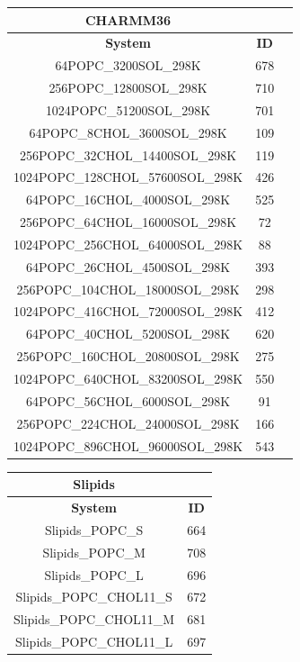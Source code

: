 \documentclass[journal=jpcbfk,manuscript=suppinfo]{achemso}
\begin{document}
\clearpage

\begin{table}[]
\begin{small}
\begin{tabular}{ccc}
\textbf{CHARMM36} \\
\toprule
\textbf{System} & \textbf{ID} \\
\midrule
64POPC\_3200SOL\_298K  &  678 \\ 
256POPC\_12800SOL\_298K  &  710 \\ 
1024POPC\_51200SOL\_298K  &  701 \\ 
\midrule
64POPC\_8CHOL\_3600SOL\_298K  &  109 \\ 
256POPC\_32CHOL\_14400SOL\_298K  &  119 \\ 
1024POPC\_128CHOL\_57600SOL\_298K  &  426 \\ 
\midrule
64POPC\_16CHOL\_4000SOL\_298K  &  525 \\ 
256POPC\_64CHOL\_16000SOL\_298K  &  72 \\ 
1024POPC\_256CHOL\_64000SOL\_298K  &  88 \\ 
\midrule
64POPC\_26CHOL\_4500SOL\_298K  &  393 \\ 
256POPC\_104CHOL\_18000SOL\_298K  &  298 \\ 
1024POPC\_416CHOL\_72000SOL\_298K  &  412 \\ 
\midrule
64POPC\_40CHOL\_5200SOL\_298K  &  620 \\ 
256POPC\_160CHOL\_20800SOL\_298K  &  275 \\ 
1024POPC\_640CHOL\_83200SOL\_298K  &  550 \\ 
\midrule
64POPC\_56CHOL\_6000SOL\_298K  &  91 \\ 
256POPC\_224CHOL\_24000SOL\_298K  &  166 \\ 
1024POPC\_896CHOL\_96000SOL\_298K  &  543 \\ 
\bottomrule
\end{tabular}
\quad
\begin{tabular}{cc}
\textbf{Slipids} \\
\toprule
\textbf{System} & \textbf{ID} \\
\midrule
Slipids\_POPC\_S  &  664 \\ 
Slipids\_POPC\_M  &  708 \\ 
Slipids\_POPC\_L  &  696 \\ 
\midrule
Slipids\_POPC\_CHOL11\_S  &  672 \\ 
Slipids\_POPC\_CHOL11\_M  &  681 \\ 
Slipids\_POPC\_CHOL11\_L  &  697 \\ 

\end{tabular}
\end{small}
\end{table}
\end{document}
